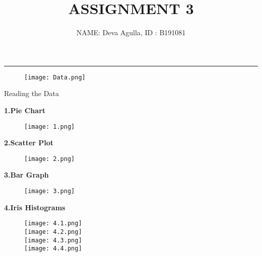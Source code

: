 \documentclass{article}
\title{\textbf{\Huge ASSIGNMENT 3}}
\author{\Large{NAME: Deva Agulla, ID : B191081}}
\begin{document}
\maketitle
\hrule
\vspace{1cm}
\Large\color{black}{DATA: }
\begin{figure}[h]
   \centering
    \texttt{[image: Data.png]}
\end{figure}
\newpage
\Huge{Reading the Data}
\Huge
\vspace{1cm}

\Huge\textbf{1.Pie Chart}
\Large
\begin{figure}[h]
    \centering
    \texttt{[image: 1.png]}
\end{figure}
\newpage

\Huge\textbf{2.Scatter Plot}
\Large
\vspace{10}
\begin{figure}[h]
   \centering
    \texttt{[image: 2.png]}
\end{figure}
\newpage

\Huge\textbf{3.Bar Graph}
\vspace{2cm}
\Large
\newpage


\begin{figure}[h]
   \centering
   \vspace{1cm}
    \texttt{[image: 3.png]}
\end{figure}
\newpage


\Huge\textbf{4.Iris Histograms}
\vspace{3cm}
\Large
\begin{figure}[h]
\centering
    \texttt{[image: 4.1.png]}\\
    \texttt{[image: 4.2.png]}\\
    \texttt{[image: 4.3.png]}\\
    \texttt{[image: 4.4.png]}\\
    
\end{figure}
\end{document}
